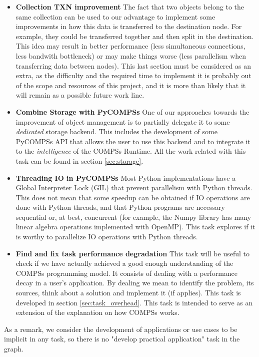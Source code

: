 \begin{itemize}
\item \textbf{Collection TXN improvement} The fact that two objects belong to the same collection can be used to our advantage to implement some improvements in how this data is transferred to the destination node. For example, they could be transferred together and then split in the destination. This idea may result in better performance (less simultaneous connections, less bandwith bottleneck) or may make things worse (less parallelism when transferring data between nodes). This last section must be considered as an extra, as the difficulty and the required time to implement it is probably out of the scope and resources of this project, and it is more than likely that it will remain as a possible future work line.

\item \textbf{Combine Storage with PyCOMPSs} One of our approaches towards the improvement of object management is to partially delegate it to some \textit{dedicated} storage backend. This includes the development of some PyCOMPSs API that allows the user to use this backend and to integrate it to the \textit{intelligence} of the COMPSs Runtime. All the work related with this task can be found in section \ref{sec:storage}.

\item \textbf{Threading IO in PyCOMPSs} Most Python implementations have a Global Interpreter Lock (GIL) that prevent parallelism with Python threads. This does not mean that some speedup can be obtained if IO operations are done with Python threads, and that Python programs are necessary sequential or, at best, concurrent (for example, the Numpy library has many linear algebra operations implemented with OpenMP). This task explores if it is worthy to parallelize IO operations with Python threads.

\item \textbf{Find and fix task performance degradation} This task will be useful to check if we have actually achieved a good enough understanding of the COMPSs programming model. It consists of dealing with a performance decay in a user's application. By dealing we mean to identify the problem, its sources, think about a solution and implement it (if applies). This task is developed in section \ref{sec:task_overhead}. This task is intended to serve as an extension of the explanation on how COMPSs works.

\end{itemize}

As a remark, we consider the development of applications or use cases to be implicit in any task, so there is no "develop practical application" task in the graph.

